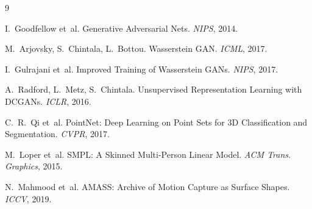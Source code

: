 \documentclass[11pt,a4paper,twocolumn]{article}
\begin{document}

\begin{thebibliography}{9}

I.~Goodfellow et~al.
\newblock Generative Adversarial Nets.
\newblock \emph{NIPS}, 2014.

M.~Arjovsky, S.~Chintala, L.~Bottou.
\newblock Wasserstein GAN.
\newblock \emph{ICML}, 2017.

I.~Gulrajani et~al.
\newblock Improved Training of Wasserstein GANs.
\newblock \emph{NIPS}, 2017.

A.~Radford, L.~Metz, S.~Chintala.
\newblock Unsupervised Representation Learning with DCGANs.
\newblock \emph{ICLR}, 2016.

C.~R.~Qi et~al.
\newblock PointNet: Deep Learning on Point Sets for 3D Classification and Segmentation.
\newblock \emph{CVPR}, 2017.

M.~Loper et~al.
\newblock SMPL: A Skinned Multi-Person Linear Model.
\newblock \emph{ACM Trans. Graphics}, 2015.

N.~Mahmood et~al.
\newblock AMASS: Archive of Motion Capture as Surface Shapes.
\newblock \emph{ICCV}, 2019.

\end{thebibliography}
\end{document}
